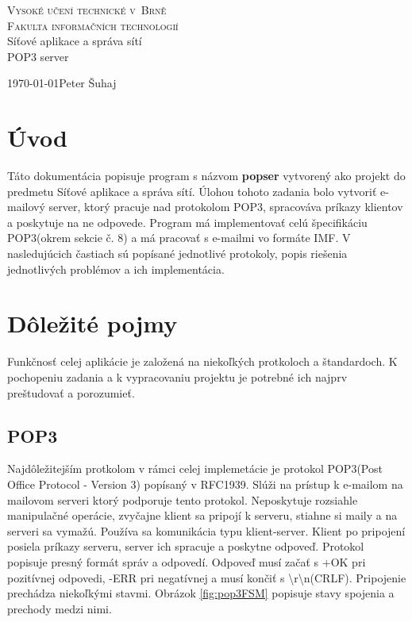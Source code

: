 \documentclass[11pt,a4paper]{article}
\begin{document}
\begin{titlepage}
\begin{center}
	\thispagestyle{empty}
	\textsc{\Huge Vysoké učení technické v~Brně\\[0.4em]
			\huge Fakulta informačních technologií}\\
	{\LARGE 
	Síťové aplikace a správa sítí\\[0.4em]
	\Huge 
	POP3 server}
\end{center}
{\LARGE \today \hfill Peter Šuhaj}
\end{titlepage}	

\setlength{\parskip}{0pt}

{\hypersetup{hidelinks}\tableofcontents}

\setlength{\parskip}{0pt}

\newpage

\section{Úvod}
Táto dokumentácia popisuje program s názvom \textbf{popser} vytvorený ako projekt do predmetu Síťové aplikace a správa sítí. Úlohou tohoto zadania bolo vytvoriť e-mailový server, ktorý pracuje nad protokolom POP3, spracováva príkazy klientov a poskytuje na ne odpovede. Program má implementovať celú špecifikáciu POP3(okrem sekcie č. 8) a má pracovať s e-mailmi vo formáte IMF. V nasledujúcich častiach sú popísané jednotlivé protokoly, popis riešenia jednotlivých problémov a ich implementácia. 


\section{Dôležité pojmy}
Funkčnosť celej aplikácie je založená na niekoľkých protkoloch a štandardoch. K pochopeniu zadania a k vypracovaniu projektu je potrebné ich najprv preštudovať a porozumieť. 


\subsection{POP3}
Najdôležitejším protkolom v rámci celej implemetácie je protokol POP3(Post Office Protocol - Version 3) popísaný v RFC1939\cite{pop3}. Slúži na prístup k e-mailom na mailovom serveri ktorý podporuje tento protokol. Neposkytuje rozsiahle manipulačné operácie, zvyčajne klient sa pripojí k serveru, stiahne si maily a na serveri sa vymažú. Používa sa komunikácia typu klient-server. Klient po pripojení posiela príkazy serveru, server ich spracuje a poskytne odpoveď. Protokol popisuje presný formát správ a odpovedí. Odpoveď musí začať s +OK pri pozitívnej odpovedi, -ERR pri negatívnej a musí končiť s \textbackslash r\textbackslash n(CRLF). Pripojenie prechádza niekoľkými stavmi. Obrázok \ref{fig:pop3FSM} popisuje stavy spojenia a prechody medzi nimi.
\end{document}
